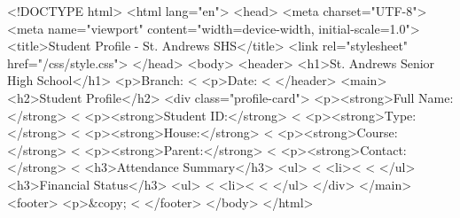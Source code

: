 <!DOCTYPE html>
<html lang="en">
<head>
  <meta charset="UTF-8">
  <meta name="viewport" content="width=device-width, initial-scale=1.0">
  <title>Student Profile - St. Andrews SHS</title>
  <link rel="stylesheet" href="/css/style.css">
</head>
<body>
  <header>
    <h1>St. Andrews Senior High School</h1>
    <p>Branch: <%
    <p>Date: <%
  </header>
  <main>
    <h2>Student Profile</h2>
    <div class="profile-card">
      <p><strong>Full Name:</strong> <%
      <p><strong>Student ID:</strong> <%
      <p><strong>Type:</strong> <%
      <p><strong>House:</strong> <%
      <p><strong>Course:</strong> <%
      <p><strong>Parent:</strong> <%
      <p><strong>Contact:</strong> <%
      <h3>Attendance Summary</h3>
      <ul>
        <%
          <li><%
        <%
      </ul>
      <h3>Financial Status</h3>
      <ul>
        <%
          <li><%
        <%
      </ul>
    </div>
  </main>
  <footer>
    <p>&copy; <%
  </footer>
</body>
</html>